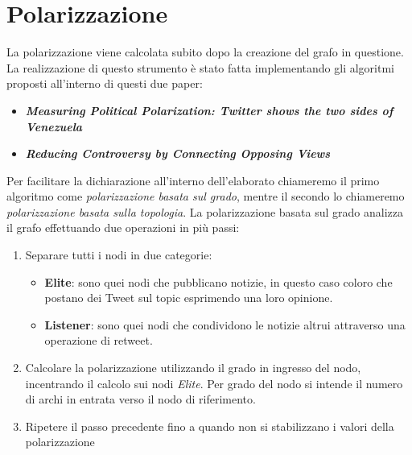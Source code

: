 \section{Polarizzazione}
La polarizzazione viene calcolata subito dopo la creazione del grafo in questione. La realizzazione di questo strumento è stato fatta implementando gli algoritmi proposti all'interno di questi due paper:
\begin{itemize}
\item \textit{\textbf{Measuring Political Polarization: Twitter shows the two sides of Venezuela}}
\item \textit{\textbf{Reducing Controversy by Connecting Opposing Views}}
\end{itemize}
Per facilitare la dichiarazione all'interno dell'elaborato chiameremo il primo algoritmo come \textit{polarizzazione basata sul grado}, mentre il secondo lo chiameremo \textit{polarizzazione basata sulla topologia}.
La polarizzazione basata sul grado analizza il grafo effettuando due operazioni in più passi:
\begin{enumerate}
\item Separare tutti i nodi in due categorie:
\begin{itemize}
\item \textbf{Elite}: sono quei nodi che pubblicano notizie, in questo caso coloro che postano dei Tweet sul topic esprimendo una loro opinione.
\item \textbf{Listener}: sono quei nodi che condividono le notizie altrui attraverso una operazione di retweet.
\end{itemize}
\item Calcolare la polarizzazione utilizzando il grado in ingresso del nodo, incentrando il calcolo sui nodi \textit{Elite}. Per grado del nodo si intende il numero di archi in entrata verso il nodo di riferimento.
\item Ripetere il passo precedente fino a quando non si stabilizzano i valori della polarizzazione
\end{enumerate}

